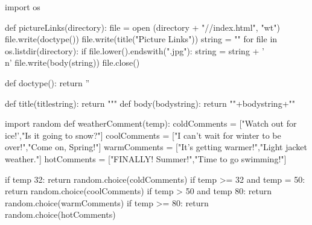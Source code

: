 \begin{exercises}
\begin{ex}
\begin{example}
import os

def pictureLinks(directory):
    file = open (directory + "//index.html", "wt")
    file.write(doctype())
    file.write(title("Picture Links"))
    string = ""
    for file in os.listdir(directory):
    if file.lower().endswith(".jpg"):
    string = string + ' \\n'
    file.write(body(string))
    file.close()

def doctype():
    return ''

def title(titlestring):
    return """
def body(bodystring): return ""+bodystring+""
\end{example}
\end{ex}

\begin{ex}%
\begin{example}
import random
def weatherComment(temp):
    coldComments = ["Watch out for ice!',"Is it going to snow?"]
    coolComments = ["I can't wait for winter to be over!","Come on, Spring!"]
    warmComments = ["It's getting warmer!","Light jacket weather."]
    hotComments = ["FINALLY! Summer!","Time to go swimming!"]

    if temp 32:
        return random.choice(coldComments)
    if temp >= 32 and temp = 50:
        return random.choice(coolComments)
    if temp > 50 and temp 80:
        return random.choice(warmComments)
    if temp >= 80:
        return random.choice(hotComments)
\end{example}
\end{ex}

\end{exercises}
